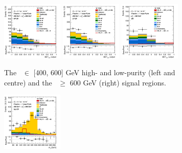 \begin{figure}[h!]
    \centering
    \begin{subfigure}[b]{\textwidth}
        \centering
        \includegraphics[width=0.32\textwidth]{Images/VH/Own_fit/prefit_VHbb/Region_distmva_BMax600_BMin400_incFat1_Fat1_DSRnoaddbjetsr_J0_TTypebb_T2_L0_Y6051_Prefit.png}
        \includegraphics[width=0.32\textwidth]{Images/VH/Own_fit/prefit_VHbb/Region_distmva_BMax600_BMin400_incFat1_Fat1_DSRnoaddbjetsr_J1_TTypebb_incJet1_T2_L0_Y6051_Prefit.png}
        \includegraphics[width=0.32\textwidth]{Images/VH/Own_fit/prefit_VHbb/Region_distmva_BMin600_incFat1_Fat1_DSRnoaddbjetsr_J0_TTypebb_incJet1_T2_L0_Y6051_Prefit.png}
        \caption{The \ptv\ $\in$ [400, 600] GeV high- and low-purity (left and centre) and the \ptv\ $\geq$ 600 GeV (right) signal regions.}
        \label{fig:plots_VHbbBoost_OL_SR}
    \end{subfigure}
    \begin{subfigure}[b]{\textwidth}
        \centering
        \includegraphics[width=0.32\textwidth]{Images/VH/Own_fit/prefit_VHbb/Region_distmBB_BMax600_BMin400_incFat1_Fat1_DSRtopaddbjetcr_J0_TTypebb_incJet1_T2_L0_Y6051_Prefit.png}

\end{subfigure}
\end{figure}
